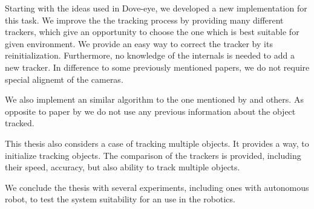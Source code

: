 Starting with the ideas used in Dove-eye, we developed a new implementation for
this task. We improve the the tracking process by providing many different
trackers, which give an opportunity to choose the one which is best suitable for
given environment. We provide an easy way to correct the tracker by its
reinitialization. Furthermore, no knowledge of the internals is needed to add a
new tracker.  In difference to some previously mentioned papers, we do not
require special alignemt of the cameras. 

We also implement an similar algorithm to the one mentioned by
\citet*{ibisch2015arbitrary} and others. As opposite to paper by
\citet*{kappeler20103d} we do not use any previous information about the object
tracked.

This thesis also considers a case of tracking multiple objects. It provides a
way, to initialize tracking objects. The comparison of the trackers is
provided, including their speed, accuracy, but also ability to track
multiple objects.

We conclude the thesis with several experiments, including ones with autonomous
robot, to test the system suitability for an use in the robotics.
